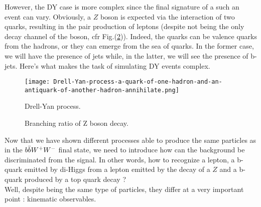 However, the DY case is more complex since the final signature of a such an event can vary. Obviously, a $Z$ boson is expected via the interaction of two quarks, resulting in the pair production of leptons (despite not being the only decay channel of the boson, cfr Fig.(\ref{z decay})). Indeed, the quarks can be valence quarks from the hadrons, or they can emerge from the sea of quarks. In the former case, we will have the presence of jets while, in the latter, we will see the presence of b-jets. Here's what makes the task of simulating DY events complex.

\begin{figure}[H]
    \centering
    \texttt{[image: Drell-Yan-process-a-quark-of-one-hadron-and-an-antiquark-of-another-hadron-annihilate.png]}
    \caption{Drell-Yan process.}
    \label{DY}
\end{figure}

\begin{figure}[H]
    \centering
    \caption{Branching ratio of Z boson decay.}
    \label{z decay}
\end{figure}

Now that we have shown different processes able to produce the same particles as in the $b \Bar{b} W^+ W^-$ final state, we need to introduce how can the background be discriminated from the signal. In other words, how to recognize a lepton, a b-quark emitted by di-Higgs from a lepton emitted by the decay of a $Z$ and a b-quark produced by a top quark decay ? \\
Well, despite being the same type of particles, they differ at a very important point : kinematic observables.

